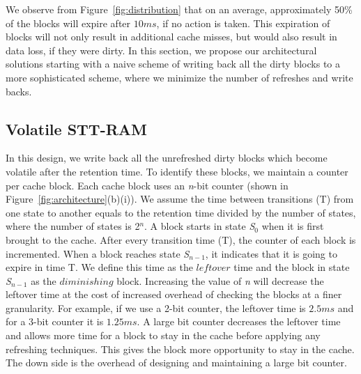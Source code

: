 
\begin{figure*} [t]
\center
 \caption{\label{fig:architecture}  A modified 16-way L2 cache architecture with a 2-bit counter and a small buffer}
\end{figure*}


We observe from Figure~\ref{fig:distribution} that on an average, approximately 50\% of the blocks will
expire after $10ms$, if no action is taken. This expiration of blocks will not only result in additional cache misses,
but would also
result in data loss, if they were dirty. In this section, we propose our architectural solutions starting with
a naive scheme of writing back
all the dirty blocks to a more sophisticated scheme, where we minimize the number of refreshes and write backs.

\subsection{{Volatile STT-RAM}}
In this design, we write back all the unrefreshed dirty blocks which become volatile after the
retention time. To identify these blocks, we maintain a counter per cache block. Each cache block
uses an {\it n}-bit counter (shown in Figure~\ref{fig:architecture}(b)(i)).
We assume the time between transitions (T) from one state to another
equals to the retention time divided by the number of states, where the number of states is 2$^n$. A
block starts in state {\it S$_0$} when it is first brought to the cache. After every transition time
(T), the counter of each block is incremented. When a block reaches  state {\it S$_{n-1}$}, it
indicates that it is going to expire in time T. We define this time as the
$leftover$ time and
the block in state {\it S$_{n-1}$} as  the $diminishing$ block. Increasing the value of {\it n} will
decrease the leftover time at the cost of increased overhead of checking the blocks at a finer
granularity. For example, if we use a 2-bit counter, the leftover time is $2.5ms$ and for a
3-bit counter it is $1.25ms$. A large bit counter decreases the leftover time and allows
more time for a block to stay in the cache before applying any refreshing techniques. This gives the
block more opportunity to stay in the cache. The down side is the overhead of designing and
maintaining a large bit counter.

